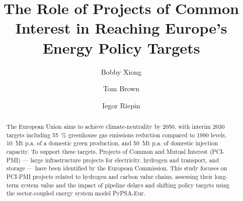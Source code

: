 \documentclass[final,5p,times,twocolumn,sort&compress]{elsarticle}
\begin{document}
\begin{frontmatter}



\title{The Role of Projects of Common Interest in Reaching Europe's Energy Policy Targets}


\author[affi1]{Bobby Xiong} %
\author[affil1]{Tom Brown}
\author[affil1]{Iegor Riepin}



\begin{abstract}
The European Union aims to achieve climate-neutrality by 2050, with interim 2030 targets including \SI{55}{\percent} greenhouse gas emissions reduction compared to 1990 levels, \SI{10}{Mt} p.a. of a domestic green  production, and \SI{50}{Mt} p.a. of domestic  injection capacity. To support these targets, Projects of Common and Mutual Interest (PCI-PMI) --- large infrastructure projects for electricity, hydrogen and  transport, and storage --- have been identified by the European Commission. This study focuses on PCI-PMI projects related to hydrogen and carbon value chains, assessing their long-term system value and the impact of pipeline delays and shifting policy targets using the sector-coupled energy system model PyPSA-Eur.


\end{abstract}
\end{frontmatter}
\end{document}
